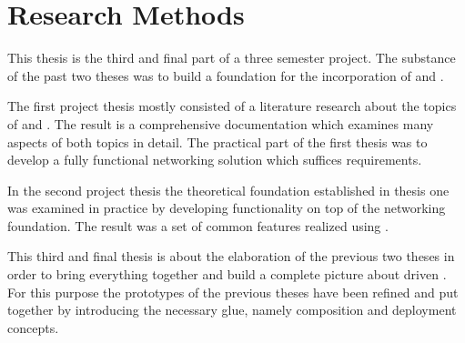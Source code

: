 \chapter{Research Methods}

This thesis is the third and final part of a three semester project. The
substance of the past two theses was to build a foundation for the incorporation
of \mss{} and \ogs{}. 

The first project thesis \cite{biedermann2015project1} mostly consisted of a
literature research about the topics of \ogs{} and \mss{}. The result is a
comprehensive documentation which examines many aspects of both topics in
detail. The practical part of the first thesis was to develop a fully functional
\ms{} networking solution which suffices \og{} requirements.

In the second project thesis \cite{biedermann2016project2} the theoretical
foundation established in thesis one was examined in practice by developing
\og{} functionality on top of the networking foundation. The result was a set of
common \og{} features realized using \mss{}.

This third and final thesis is about the elaboration of the previous two theses
in order to bring everything together and build a complete picture about
\ms{} driven \ogs{}. For this purpose the prototypes of the previous theses have
been refined and put together by introducing the necessary glue, namely \ms{}
composition and deployment concepts.



 
















